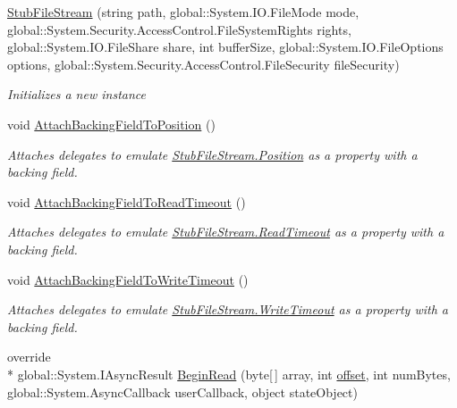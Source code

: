 \begin{DoxyCompactItemize}
\hyperlink{class_system_1_1_i_o_1_1_fakes_1_1_stub_file_stream_ae3ecd311bf68b8d486b52036a1210463}{Stub\-File\-Stream} (string path, global\-::\-System.\-I\-O.\-File\-Mode mode, global\-::\-System.\-Security.\-Access\-Control.\-File\-System\-Rights rights, global\-::\-System.\-I\-O.\-File\-Share share, int buffer\-Size, global\-::\-System.\-I\-O.\-File\-Options options, global\-::\-System.\-Security.\-Access\-Control.\-File\-Security file\-Security)
\begin{DoxyCompactList}\small\item\em Initializes a new instance\end{DoxyCompactList}\item 
void \hyperlink{class_system_1_1_i_o_1_1_fakes_1_1_stub_file_stream_a4a3f177eece85b791507500b78733550}{Attach\-Backing\-Field\-To\-Position} ()
\begin{DoxyCompactList}\small\item\em Attaches delegates to emulate \hyperlink{class_system_1_1_i_o_1_1_fakes_1_1_stub_file_stream_a327db6cff7ff7dcdab3eb56c43fd0b49}{Stub\-File\-Stream.\-Position} as a property with a backing field.\end{DoxyCompactList}\item 
void \hyperlink{class_system_1_1_i_o_1_1_fakes_1_1_stub_file_stream_a7cfc0ea348c8be7e84eab190a82e2368}{Attach\-Backing\-Field\-To\-Read\-Timeout} ()
\begin{DoxyCompactList}\small\item\em Attaches delegates to emulate \hyperlink{class_system_1_1_i_o_1_1_fakes_1_1_stub_file_stream_a2ddebba00acbdc7dcc379db1d4ba7b93}{Stub\-File\-Stream.\-Read\-Timeout} as a property with a backing field.\end{DoxyCompactList}\item 
void \hyperlink{class_system_1_1_i_o_1_1_fakes_1_1_stub_file_stream_a68802dbe7ad731cba9a4f520ae2d4feb}{Attach\-Backing\-Field\-To\-Write\-Timeout} ()
\begin{DoxyCompactList}\small\item\em Attaches delegates to emulate \hyperlink{class_system_1_1_i_o_1_1_fakes_1_1_stub_file_stream_ae96601dd93627a1937ba06320fc05565}{Stub\-File\-Stream.\-Write\-Timeout} as a property with a backing field.\end{DoxyCompactList}\item 
override \\*
global\-::\-System.\-I\-Async\-Result \hyperlink{class_system_1_1_i_o_1_1_fakes_1_1_stub_file_stream_a17a7937d5b990b8b9ea9b85c156001e1}{Begin\-Read} (byte\mbox{[}$\,$\mbox{]} array, int \hyperlink{jquery-1_810_82_8js_a4a9f594d20d927164551fc7fa4751a2f}{offset}, int num\-Bytes, global\-::\-System.\-Async\-Callback user\-Callback, object state\-Object)

\end{DoxyCompactItemize}
